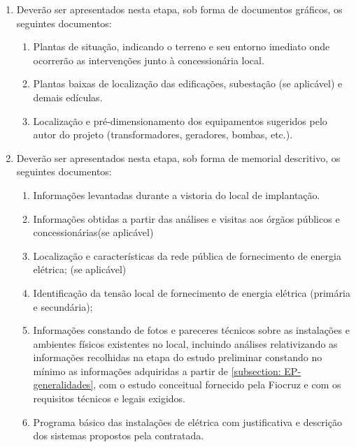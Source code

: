 \begin{enumerate}
	
	\item Deverão ser apresentados nesta etapa, sob forma de documentos gráficos, os seguintes documentos:
		\begin{enumerate}
			\item Plantas de situação, indicando o terreno e seu entorno imediato onde ocorrerão as intervenções junto à concessionária local.
		
			\item Plantas baixas de localização das edificações, subestação (se aplicável) e demais edículas.
		
			\item Localização e pré-dimensionamento dos equipamentos sugeridos pelo autor do projeto (transformadores, geradores, bombas, etc.).
		\end{enumerate}

	\item Deverão ser apresentados nesta etapa, sob forma de memorial descritivo, os seguintes documentos:
		\begin{enumerate}
			\item Informações levantadas durante a vistoria do local de implantação.
			
			\item Informações obtidas a partir das análises e visitas aos órgãos públicos e concessionárias(se aplicável)
			
			\item Localização e características da rede pública de fornecimento de energia elétrica; (se aplicável)
			
			\item Identificação da tensão local de fornecimento de energia elétrica (primária e secundária); 
			
			
			\item Informações constando de fotos e pareceres técnicos sobre as instalações e ambientes físicos existentes no local, incluindo análises relativizando as informações recolhidas na etapa do estudo preliminar constando no mínimo as informações adquiridas a partir de \ref{subsection: EP-generalidades}, com o estudo conceitual fornecido pela Fiocruz e com os requisitos técnicos e legais exigidos.
			
			\item Programa básico das instalações de elétrica com justificativa e descrição dos sistemas propostos pela contratada.
			

\end{enumerate}
\end{enumerate}
